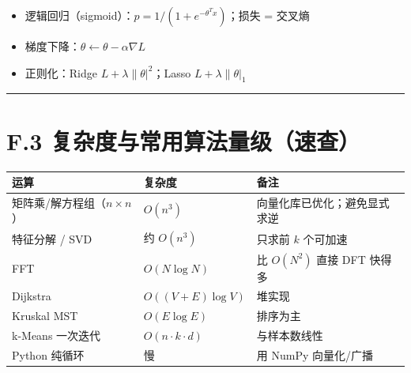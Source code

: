 \begin{itemize}
\tightlist
\item
  逻辑回归（sigmoid）：\(p=1/(1+e^{-\theta^Tx})\)；损失 = 交叉熵
\item
  梯度下降：\(\theta\gets\theta-\alpha\nabla L\)
\item
  正则化：Ridge \(L+\lambda\|\theta|^2\)；Lasso \(L+\lambda\|\theta|_1\)
\end{itemize}

\begin{center}\rule{0.5\linewidth}{0.5pt}\end{center}

\section{F.3
复杂度与常用算法量级（速查）}\label{f.3-ux590dux6742ux5ea6ux4e0eux5e38ux7528ux7b97ux6cd5ux91cfux7ea7ux901fux67e5}

{\def\LTcaptype{none} %
\begin{longtable}[]{@{}
  >{\raggedright\arraybackslash}p{}
  >{\raggedright\arraybackslash}p{}
  >{\raggedright\arraybackslash}p{}@{}}
\toprule\noalign{}
\begin{minipage}[b]{\linewidth}\raggedright
运算
\end{minipage} & \begin{minipage}[b]{\linewidth}\raggedright
复杂度
\end{minipage} & \begin{minipage}[b]{\linewidth}\raggedright
备注
\end{minipage} \\
\midrule\noalign{}
\endhead
\bottomrule\noalign{}
\endlastfoot
矩阵乘/解方程组（\(n\times n\)） & \(O(n^3)\) &
向量化库已优化；避免显式求逆 \\
特征分解 / SVD & 约 \(O(n^3)\) & 只求前 \(k\) 个可加速 \\
FFT & \(O(N\log N)\) & 比 \(O(N^2)\) 直接 DFT 快得多 \\
Dijkstra & \(O((V+E)\log V)\) & 堆实现 \\
Kruskal MST & \(O(E\log E)\) & 排序为主 \\
k-Means 一次迭代 & \(O(n\cdot k\cdot d)\) & 与样本数线性 \\
Python 纯循环 & 慢 & 用 NumPy 向量化/广播 \\
\end{longtable}
}

